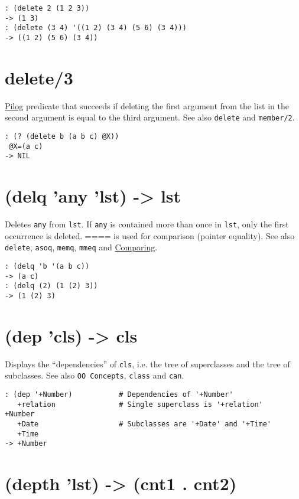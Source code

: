 {{{\begin{verbatim}
: (delete 2 (1 2 3))
-> (1 3)
: (delete (3 4) '((1 2) (3 4) (5 6) (3 4)))
-> ((1 2) (5 6) (3 4))
\end{verbatim}

 
\section{delete/3}
\label{sec-8-1-4-27}


\hyperref[ref.html-pilog]{Pilog} predicate that succeeds if deleting the first
argument from the list in the second argument is equal to the third
argument. See also \texttt{delete} and \texttt{member/2}.


\begin{verbatim}
: (? (delete b (a b c) @X))
 @X=(a c)
-> NIL
\end{verbatim}

 
\section{(delq 'any 'lst) -> lst}
\label{sec-8-1-4-28}


Deletes \texttt{any} from \texttt{lst}. If \texttt{any} is contained more than once in \texttt{lst},
only the first occurrence is deleted. ==== is used for comparison
(pointer equality). See also \texttt{delete}, \texttt{asoq}, \texttt{memq}, \texttt{mmeq} and
\hyperref[ref.html-cmp]{Comparing}.


\begin{verbatim}
: (delq 'b '(a b c))
-> (a c)
: (delq (2) (1 (2) 3))
-> (1 (2) 3)
\end{verbatim}

 
\section{(dep 'cls) -> cls}
\label{sec-8-1-4-29}


Displays the ``dependencies'' of \texttt{cls}, i.e. the tree of superclasses and
the tree of subclasses. See also \texttt{OO Concepts}, \texttt{class} and \texttt{can}.


\begin{verbatim}
: (dep '+Number)           # Dependencies of '+Number'
   +relation               # Single superclass is '+relation'
+Number
   +Date                   # Subclasses are '+Date' and '+Time'
   +Time
-> +Number
\end{verbatim}

 
\section{(depth 'lst) -> (cnt1 . cnt2)}
\label{sec-8-1-4-30}


}}}
